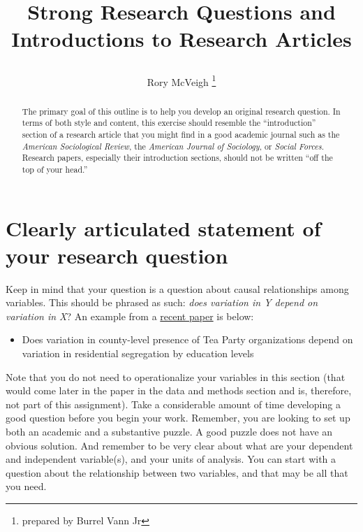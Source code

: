 \documentclass[12pt]{article}
\begin{document}
\title{\begin{singlespace}Strong Research Questions and Introductions to Research Articles\end{singlespace}}
\author[]{Rory McVeigh
\thanks{prepared by Burrel Vann Jr}
}
\doublespacing
\date{}
\maketitle



\begin{abstract}
\begin{singlespace}
The primary goal of this outline is to help you develop an original research question. In terms of both style and content, this exercise should resemble the ``introduction'' section of a research article that you might find in a good academic journal such as the {\it{American Sociological Review}}, the {\it{American Journal of Sociology}}, or {\it{Social Forces}}. Research papers, especially their introduction sections, should not be written ``off the top of your head.''
\end{singlespace}
\end{abstract}
\newpage



\section{{\textbf{Clearly articulated statement of your research question}}}
\begin{singlespace}
Keep in mind that your question is a question about causal relationships among variables. This should be phrased as such: {\it{does variation in Y depend on variation in X}}? An example from a \href{http://asr.sagepub.com/content/79/4/630.full.pdf}{recent paper} is below:
\begin{itemize}
\item Does variation in county-level presence of Tea Party organizations depend on variation in residential segregation by education levels
\end{itemize}

Note that you do not need to operationalize your variables in this section (that would come later in the paper in the data and methods section and is, therefore, not part of this assignment). Take a considerable amount of time developing a good question before you begin your work. Remember, you are looking to set up both an academic and a substantive puzzle. A good puzzle does not have an obvious solution. And remember to be very clear about what are your dependent and independent variable(s), and your units of analysis. You can start with a question about the relationship between two variables, and that may be all that you need.  
\end{singlespace}
\end{document}
